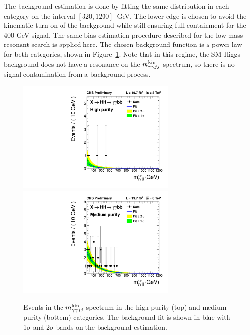 The background estimation is done by fitting the same distribution in each category on the interval
$[320, 1200]$~GeV. The lower edge is chosen to avoid the kinematic turn-on of the background
while still ensuring full containment for the 400 GeV signal. The same bias estimation procedure
described for the low-mass resonant search is applied here. The chosen background function is a power
law for both categories, shown in Figure~\ref{fig:datafit_4body}. Note that in this regime,
the SM Higgs background does not have a resonance on the $m_{\gamma\gamma jj}^{\rm kin}$ spectrum, so
there is no signal contamination from a background process.

\begin{figure}[ht]
 \begin{center}
   \includegraphics[width=0.70\textwidth]{figures/results/databkgoversig_cat0_4body.pdf}
   \includegraphics[width=0.70\textwidth]{figures/results/databkgoversig_cat1_4body.pdf}
 \end{center}
\caption{Events in the $m_{\gamma\gamma jj}^{\rm kin}$ spectrum in the high-purity (top) and medium-purity (bottom)
categories. The background fit is shown in blue
with 1$\sigma$ and 2$\sigma$ bands on the background estimation.}
\label{fig:datafit_4body}
\end{figure}

